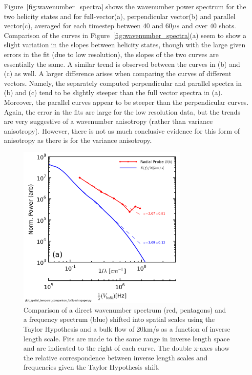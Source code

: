 \documentclass[aip,prl,amsmath,amssymb,reprint,superscriptaddress]{revtex4-1} %
\begin{document}
Figure~\ref{fig:wavenumber_spectra} shows the wavenumber power spectrum for the two helicity states and for full-vector(a), perpendicular vector(b) and parallel vector(c), averaged for each timestep between 40 and 60$\mu s$ and over 40 shots. Comparison of the curves in Figure~\ref{fig:wavenumber_spectra}(a) seem to show a slight variation in the slopes between helicity states, though with the large given errors in the fit (due to low resolution), the slopes of the two curves are essentially the same. A similar trend is observed between the curves in (b) and (c) as well. A larger difference arises when comparing the curves of different vectors. Namely, the separately computed perpendicular and parallel spectra in (b) and (c) tend to be slightly steeper than the full vector spectra in (a). Moreover, the parallel curves appear to be steeper than the perpendicular curves. Again, the error in the fits are large for the low resolution data, but the trends are very suggestive of a wavenumber anisotropy (rather than variance anisotropy). However, there is not as much conclusive evidence for this form of anisotropy as there is for the variance anisotropy.

\begin{figure}[!htbp]
\centerline{
\includegraphics[width=8.5cm]{B_spatial_temporal_comp_wFits_40t60us}}
\caption{\label{fig:wavenumber_comp} Comparison of a direct wavenumber spectrum (red, pentagons) and a frequency spectrum (blue) shifted into spatial scales using the Taylor Hypothesis and a bulk flow of 20km/s as a function of inverse length scale. Fits are made to the same range in inverse length space and are indicated to the right of each curve. The double x-axes show the relative correspondence between inverse length scales and frequencies given the Taylor Hypothesis shift.}
\end{figure}
\end{document}
